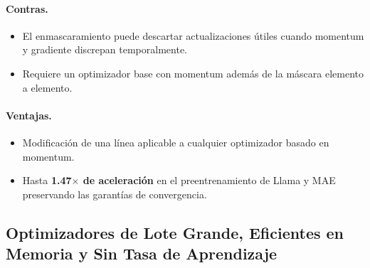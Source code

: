 \paragraph{Contras.}
\begin{itemize}[leftmargin=*]
\item El enmascaramiento puede descartar actualizaciones útiles cuando momentum y gradiente discrepan temporalmente.
\item Requiere un optimizador base con momentum además de la máscara elemento a elemento.
\end{itemize}

\paragraph{Ventajas.}
\begin{itemize}[leftmargin=*]
\item Modificación de una línea aplicable a cualquier optimizador basado en momentum.
\item Hasta \textbf{1.47$\times$ de aceleración} en el preentrenamiento de Llama y MAE preservando las garantías de convergencia.
\end{itemize}

\subsection{Optimizadores de Lote Grande, Eficientes en Memoria y Sin Tasa de Aprendizaje}
